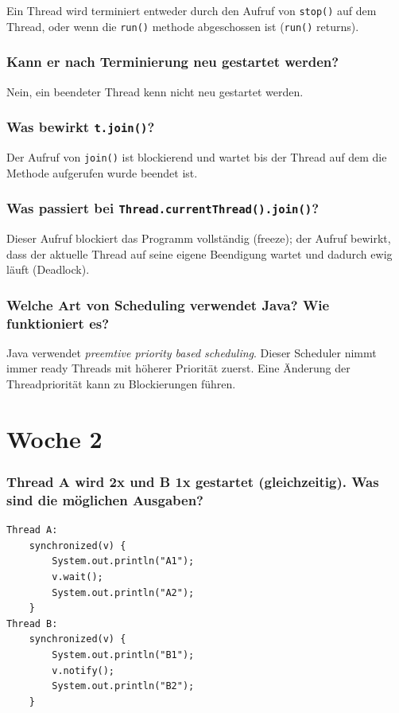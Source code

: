 \documentclass[10pt,a4paper]{scrartcl}
\begin{document}
Ein Thread wird terminiert entweder durch den Aufruf von \texttt{stop()} auf dem Thread, oder wenn
die \texttt{run()} methode abgeschossen ist (\texttt{run()} returns).
   
\subsubsection{Kann er nach Terminierung neu gestartet werden?}

Nein, ein beendeter Thread kenn nicht neu gestartet werden.
   
\subsubsection{Was bewirkt \texttt{t.join()}?}

Der Aufruf von \texttt{join()} ist blockierend und wartet bis der Thread auf dem die Methode
aufgerufen wurde beendet ist. 
   
\subsubsection{Was passiert bei \texttt{Thread.currentThread().join()}?}

Dieser Aufruf blockiert das Programm vollständig (freeze); der Aufruf bewirkt, dass der aktuelle
Thread auf seine eigene Beendigung wartet und dadurch ewig läuft (Deadlock).
   
\subsubsection{Welche Art von Scheduling verwendet Java? Wie funktioniert es? }

Java verwendet \textit{preemtive priority based scheduling}. Dieser Scheduler nimmt immer ready Threads
mit höherer Priorität zuerst. Eine Änderung der Threadpriorität kann zu Blockierungen führen.


\section{Woche 2}


\subsubsection{Thread A wird 2x und B 1x gestartet (gleichzeitig). Was sind die möglichen
Ausgaben?}

\begin{verbatim}
Thread A:
    synchronized(v) { 
        System.out.println("A1"); 
        v.wait(); 
        System.out.println("A2"); 
    }   
Thread B:
    synchronized(v) {
        System.out.println("B1");
        v.notify();
        System.out.println("B2");
    }   
\end{verbatim}
\end{document}
